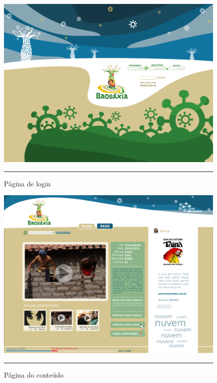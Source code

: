\begin{itemize}
\begin{figure}[htbp]
  \centering
  \includegraphics[width=\textwidth]{./Fig/layout-login.pdf}
  \rule{35em}{0.5pt}
  \caption[Página de login]{Página de login}
  \label{fig:layout-login}
\end{figure}

\begin{figure}[htbp]
  \centering
  \includegraphics[width=\textwidth]{./Fig/layout-pgCONTEUDO.pdf}
  \rule{35em}{0.5pt}
  \caption[Página do conteúdo]{Página do conteúdo}
  \label{fig:layout-pgCONTEUDO}
\end{figure}


\end{itemize}
